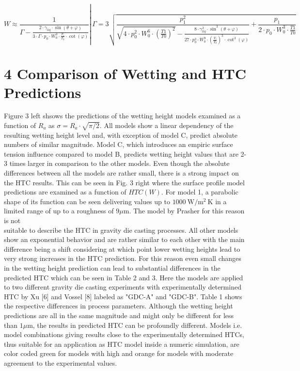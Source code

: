 \documentclass[10pt]{article}
\begin{document}
\begin{equation*}
W \approx \frac{1}{\Gamma-\frac{2 \cdot \gamma_{l i q} \cdot \sin (\theta+\varphi)}{3 \cdot \Gamma \cdot p_{0} \cdot W_{0}^{3} \cdot \frac{T_{1}}{T_{0}} \cdot \cot (\varphi)}} \left\lvert\, \Gamma=3 \sqrt{\frac{p_{1}^{2}}{\sqrt{4 \cdot p_{0}^{2} \cdot W_{0}^{6} \cdot\left(\frac{T 1}{T 0}\right)^{2}}-\frac{8 \cdot \gamma_{l i q}^{3} \cdot \sin ^{3}(\theta+\varphi)}{27 \cdot p_{0}^{3} \cdot W_{0}^{9} \cdot\left(\frac{T_{1}}{T_{0}}\right)^{3} \cdot \cot ^{3}(\varphi)}}+\frac{p_{1}}{2 \cdot p_{0} \cdot W_{0}^{3} \cdot \frac{T 1}{T 0}}}\right. \tag{29}
\end{equation*}


\section*{4 Comparison of Wetting and HTC Predictions}
Figure 3 left shsows the predictions of the wetting height models examined as a function of $R_{a}$ as $\sigma=R_{a} \cdot \sqrt{\pi / 2}$. All models show a linear dependency of the resulting wetting height level and, with exception of model $\mathrm{C}$, predict absolute numbers of similar magnitude. Model $\mathrm{C}$, which introduces an empiric surface tension influence compared to model B, predicts wetting height values that are 2-3 times larger in comparison to the other models. Even though the absolute differences between all the models are rather small, there is a strong impact on the HTC results. This can be seen in Fig. 3 right where the surface profile model predictions are examined as a function of $H T C(W)$. For model 1, a parabolic shape of its function can be seen delivering values up to $1000 \mathrm{~W} / \mathrm{m}^{2} \mathrm{~K}$ in a limited range of up to a roughness of $9 \mu \mathrm{m}$. The model by Prasher for this reason is not\\
suitable to describe the HTC in gravity die casting processes. All other models show an exponential behavior and are rather similar to each other with the main difference being a shift considering at which point lower wetting heights lead to very strong increases in the HTC prediction. For this reason even small changes in the wetting height prediction can lead to substantial differences in the predicted HTC which can be seen in Table 2 and 3. Here the models are applied to two different gravity die casting experiments with experimentally determined HTC by Xu [6] and Vossel [8] labeled as "GDC-A" and "GDC-B". Table 1 shows the respective differences in process parameters. Although the wetting height predictions are all in the same magnitude and might only be different for less than $1 \mu \mathrm{m}$, the results in predicted HTC can be profoundly different. Models i.e. model combinations giving results close to the experimentally determined HTCs, thus suitable for an application as HTC model inside a numeric simulation, are color coded green for models with high and orange for models with moderate agreement to the experimental values.
\end{document}
